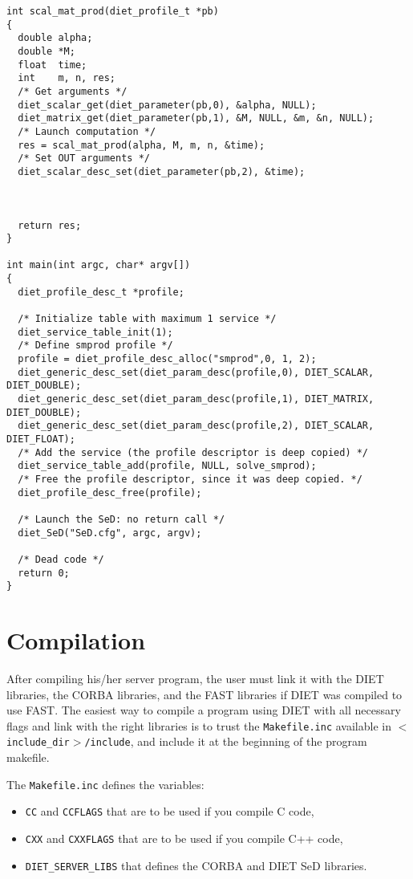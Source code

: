 {{{\begin{verbatim}
int scal_mat_prod(diet_profile_t *pb)
{
  double alpha;
  double *M;
  float  time;
  int    m, n, res;
  /* Get arguments */
  diet_scalar_get(diet_parameter(pb,0), &alpha, NULL);
  diet_matrix_get(diet_parameter(pb,1), &M, NULL, &m, &n, NULL);
  /* Launch computation */
  res = scal_mat_prod(alpha, M, m, n, &time);
  /* Set OUT arguments */
  diet_scalar_desc_set(diet_parameter(pb,2), &time);



  return res;
}

int main(int argc, char* argv[])
{
  diet_profile_desc_t *profile;
  
  /* Initialize table with maximum 1 service */
  diet_service_table_init(1);
  /* Define smprod profile */
  profile = diet_profile_desc_alloc("smprod",0, 1, 2);
  diet_generic_desc_set(diet_param_desc(profile,0), DIET_SCALAR, DIET_DOUBLE);
  diet_generic_desc_set(diet_param_desc(profile,1), DIET_MATRIX, DIET_DOUBLE);
  diet_generic_desc_set(diet_param_desc(profile,2), DIET_SCALAR, DIET_FLOAT);
  /* Add the service (the profile descriptor is deep copied) */
  diet_service_table_add(profile, NULL, solve_smprod);
  /* Free the profile descriptor, since it was deep copied. */
  diet_profile_desc_free(profile);

  /* Launch the SeD: no return call */
  diet_SeD("SeD.cfg", argc, argv);

  /* Dead code */
  return 0;
}
\end{verbatim}
}


\section{Compilation}
\label{sec:sv_comp}


After compiling his/her server program, the user must link it with the DIET
libraries, the CORBA libraries, and the FAST libraries if DIET was compiled to
use FAST. The easiest way to compile a program using DIET with all
necessary flags and link with the right libraries is to trust the
\texttt{Makefile.inc} available in \texttt{$<$include\_dir$>$/include}, and
include it at the beginning of the program makefile.

The \texttt{Makefile.inc} defines the variables:
\begin{itemize}
\item \texttt{CC} and \texttt{CCFLAGS} that are to be used if you compile C
 code,
\item \texttt{CXX} and \texttt{CXXFLAGS} that are to be used if you compile C++
  code,
\item \texttt{DIET\_SERVER\_LIBS} that defines the CORBA and DIET SeD libraries.
\end{itemize}

}}
